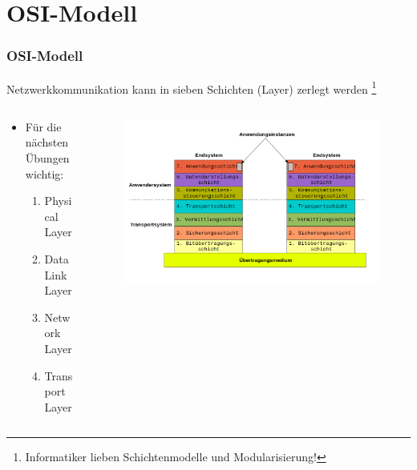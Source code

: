\documentclass[xcolor=dvipsnames, aspectratio=169]{beamer}
\begin{document}
\section{OSI-Modell}
\begin{frame}
	\frametitle{OSI-Modell}
	Netzwerkkommunikation kann in sieben Schichten (Layer) zerlegt werden \footnote{Informatiker lieben Schichtenmodelle und Modularisierung!}
	\begin{columns}
		\begin{column}{0.5\textwidth}
   			\begin{itemize}
   				\item Für die nächsten Übungen wichtig:
   				\begin{enumerate}
   					\item Physical Layer
   					\item Data Link Layer
   					\item Network Layer
   					\item Transport Layer
   				\end{enumerate}
   			\end{itemize}
		\end{column}
	\begin{column}{0.5\textwidth}
	\vspace{-1cm}
	\begin{figure}
    \begin{center}
     \includegraphics[scale=0.2]{osi_modell}
     \end{center}
     \end{figure}
\end{column}
\end{columns}
\end{frame}
\end{document}
